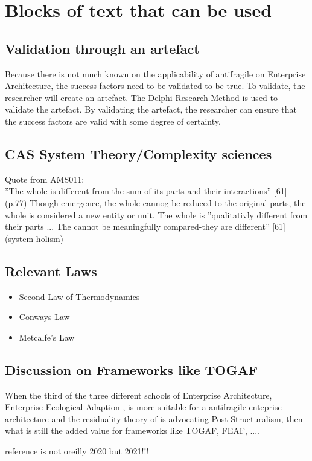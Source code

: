 \chapter{Blocks of text that can be used}

\section{Validation through an artefact}
Because there is not much known on the applicability of antifragile on Enterprise Architecture, the success factors need to be validated to be true. To validate, the researcher will create an artefact. The Delphi Research Method is used to validate the artefact. By validating the artefact, the researcher can ensure that the success factors are valid with some degree of certainty.\\

\section{CAS System Theory/Complexity sciences}
Quote from AMS011:\\
''The whole is different from the sum of its parts and their interactions'' [61] (p.77) Though emergence, the whole cannog be reduced to the original parts, the whole is considered a new entity or unit. The whole is ''qualitativly different from their parts ... The cannot be meaningfully compared-they are different'' [61] (system holism)

\section{Relevant Laws}
\begin{itemize}
	\item{Second Law of Thermodynamics}
	\item{Conways Law}
	\item{Metcalfe's Law}
\end{itemize}

\section{Discussion on Frameworks like TOGAF}
When the third of the three different schools of Enterprise Architecture, Enterprise Ecological Adaption \parencite{Lapalme2012}, is more suitable for a antifragile enteprise architecture and the residuality theory of \textcite[p. 809]{OReilly2021} is advocating Post-Structuralism, then what is still the added value for frameworks like TOGAF, FEAF, ....
\begin{remark}
reference is not oreilly 2020 but 2021!!!
\end{remark}
